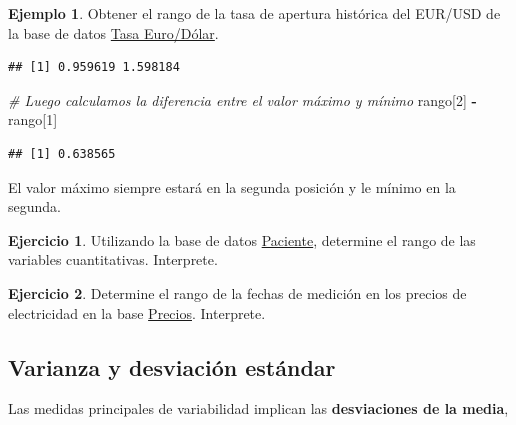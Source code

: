 \documentclass[
  11pt,
]{book}
\newenvironment{Shaded}{\begin{snugshade}}{\end{snugshade}}
\newcommand{\AttributeTok}[1]{\textcolor[rgb]{0.13,0.29,0.53}{#1}}
\newcommand{\CommentTok}[1]{\textcolor[rgb]{0.56,0.35,0.01}{\textit{#1}}}
\newcommand{\DecValTok}[1]{\textcolor[rgb]{0.00,0.00,0.81}{#1}}
\newcommand{\FunctionTok}[1]{\textcolor[rgb]{0.13,0.29,0.53}{\textbf{#1}}}
\newcommand{\NormalTok}[1]{#1}
\newcommand{\SpecialCharTok}[1]{\textcolor[rgb]{0.81,0.36,0.00}{\textbf{#1}}}
\theoremstyle{definition}
\theoremstyle{definition}
\newtheorem{example}{Ejemplo}[chapter]
\theoremstyle{definition}
\newtheorem{exercise}{Ejercicio}[chapter]
\theoremstyle{definition}
\theoremstyle{remark}
\begin{document}
\begin{example}
Obtener el rango de la tasa de apertura histórica del EUR/USD de la base de datos \hyperref[TasaEURUSD]{Tasa Euro/Dólar}.

\begin{Shaded}
\end{Shaded}

\begin{verbatim}
## [1] 0.959619 1.598184
\end{verbatim}

\begin{Shaded}
\begin{Highlighting}[]
\CommentTok{\# Luego calculamos la diferencia entre el valor máximo y mínimo}
\NormalTok{rango[}\DecValTok{2}\NormalTok{] }\SpecialCharTok{{-}}\NormalTok{ rango[}\DecValTok{1}\NormalTok{]}
\end{Highlighting}
\end{Shaded}

\begin{verbatim}
## [1] 0.638565
\end{verbatim}

El valor máximo siempre estará en la segunda posición y le mínimo en la segunda.
\end{example}

\begin{exercise}
Utilizando la base de datos \hyperref[Pacientes]{Paciente}, determine el rango de las variables cuantitativas. Interprete.
\end{exercise}

\begin{exercise}
Determine el rango de la fechas de medición en los precios de electricidad en la base \hyperref[PreciosElectricidad]{Precios}. Interprete.
\end{exercise}

\subsection{Varianza y desviación estándar}\label{varianza-y-desviaciuxf3n-estuxe1ndar}

Las medidas principales de variabilidad implican las \textbf{desviaciones de la media},
\end{document}
